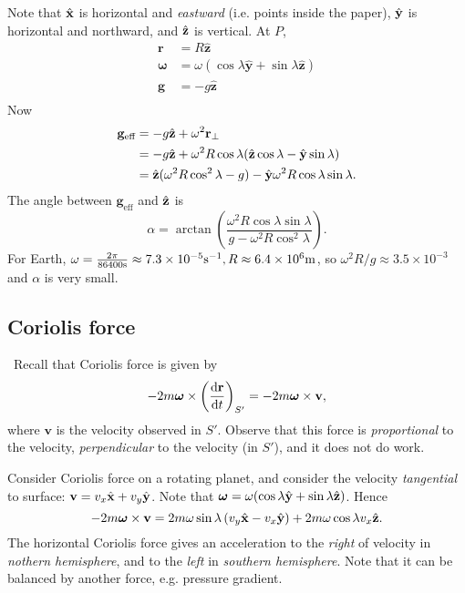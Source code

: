 Note that $ \hat{{\bf x}} $ is horizontal and \textit{eastward} (i.e. points inside the paper), $ \hat{{\bf y}} $ is horizontal and northward, and $ \hat{{\bf z}} $ is vertical. At $P$,
\begin{align*}
    \mathbf{r} &= R\hat{\mathbf{z}}\\
    \boldsymbol\omega &= \omega(\cos\lambda \hat{\mathbf{y}} + \sin \lambda \hat{\mathbf{z}})\\
    \mathbf{g} &= -g\hat{\mathbf{z}}\\
\end{align*}
Now 
\begin{align*}
    \mathbf{g}_{\text{eff}} &= -g \hat{{\bf z}}+ \omega^2 \mathbf{r}_\perp\\ 
    &=  -g \hat{{\bf z}}+ \omega^2 R \cos \lambda(\hat{{\bf z}} \cos \lambda-\hat{{\bf y}}\sin \lambda)\\
    &= \hat{{\bf z}}(\omega^2 R \cos^2 \lambda-g)- \hat{{\bf y}}\omega^2 R \cos \lambda \sin \lambda.
\end{align*}
The angle between $ \mathbf{g}_{\text{eff}} $ and $ \hat{{\bf z}} $ is 
\[
    \alpha = \arctan \left( \frac{\omega^2 R \cos \lambda \sin \lambda}{g-\omega^2 R \cos^2 \lambda} \right).
\]
For Earth, $ \omega=\frac{2\pi}{86400\mathrm{s}}\approx 7.3 \times 10^{-5}\mathrm{s}^{-1},R \approx 6.4 \times 10^6 \mathrm{m} $, so $ \omega^2 R/g \approx 3.5 \times 10^{-3} $ and $ \alpha $ is very small.
\subsection{Coriolis force}\
Recall that Coriolis force is given by 
\[
    -2m\boldsymbol{\omega}\times \left( \frac{\mathrm{d}{\bf r}}{\mathrm{d}t}  \right)_{S'} = -2m \boldsymbol{\omega} \times \mathbf{v},
\]
where $ \mathbf{v} $ is the velocity observed in $ S' $. Observe that this force is \textit{proportional} to the velocity, \textit{perpendicular} to the velocity (in $S'$), and it does not do work.

Consider Coriolis force on a rotating planet, and consider the velocity \textit{tangential} to surface: $ \mathbf{v} = v_x \hat{{\bf x}}+ v_y \hat{{\bf y}} $. Note that $ \boldsymbol{\omega}=\omega( \cos \lambda \hat{{\bf y}}+ \sin \lambda \hat{{\bf z}}) $. Hence 
\[
    -2m \boldsymbol{\omega}\times \mathbf{v} = 2m\omega \sin \lambda \left( v_y \hat{{\bf x}}-v_x \hat{{\bf y}} \right)+2m\omega \cos \lambda v_x \hat{{\bf z}}.
\]
The horizontal Coriolis force gives an acceleration to the \textit{right} of velocity in \textit{nothern hemisphere}, and to the \textit{left} in \textit{southern hemisphere}. Note that it can be balanced by another force, e.g. pressure gradient.

